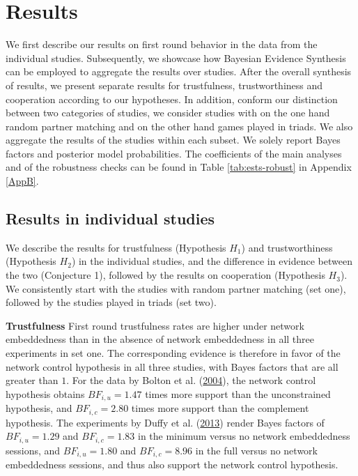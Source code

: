\documentclass[
  11pt,
]{article}
\begin{document}
\hypertarget{results}{%
\section{Results}\label{results}}

We first describe our results on first round behavior in the data from the individual studies.
Subsequently, we showcase how Bayesian Evidence Synthesis can be employed to aggregate the results over studies.
After the overall synthesis of results, we present separate results for trustfulness, trustworthiness and cooperation according to our hypotheses.
In addition, conform our distinction between two categories of studies, we consider studies with on the one hand random partner matching and on the other hand games played in triads.
We also aggregate the results of the studies within each subset.
We solely report Bayes factors and posterior model probabilities. The coefficients of the main analyses and of the robustness checks can be found in Table \ref{tab:ests-robust} in Appendix \ref{AppB}.

\hypertarget{results-in-individual-studies}{%
\subsection{Results in individual studies}\label{results-in-individual-studies}}

We describe the results for trustfulness (Hypothesis \(H_1\)) and trustworthiness (Hypothesis \(H_2\)) in the individual studies, and the difference in evidence between the two (Conjecture 1), followed by the results on cooperation (Hypothesis \(H_3\)).
We consistently start with the studies with random partner matching (set one), followed by the studies played in triads (set two).

\textbf{Trustfulness} \hspace{8pt} First round trustfulness rates are higher under network embeddedness than in the absence of network embeddedness in all three experiments in set one.
The corresponding evidence is therefore in favor of the network control hypothesis in all three studies, with Bayes factors that are all greater than \(1\).
For the data by Bolton et al. (\protect\hyperlink{ref-bolton_electronic_2004}{2004}), the network control hypothesis obtains \(BF_{i,u} = 1.47\) times more support than the unconstrained hypothesis, and \(BF_{i,c} = 2.80\) times more support than the complement hypothesis.
The experiments by Duffy et al. (\protect\hyperlink{ref-duffy2013social}{2013}) render Bayes factors of \(BF_{i,u} = 1.29\) and \(BF_{i,c} = 1.83\) in the minimum versus no network embeddedness sessions, and \(BF_{i,u} = 1.80\) and \(BF_{i,c} = 8.96\) in the full versus no network embeddedness sessions, and thus also support the network control hypothesis.
\end{document}
